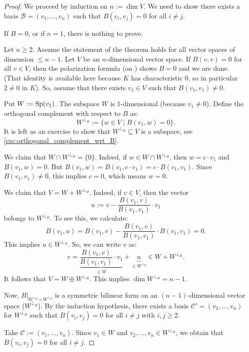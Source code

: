 \begin{proof}
We proceed by induction on $n := \dim V$. We need to show there exists a basis $\mathcal{B} = (v_1, \dots, v_n)$ such that $B(v_i, v_j) = 0$ for all $i \neq j$.

If $B = 0$, or if $n = 1$, there is nothing to prove.

Let $n \ge 2$. Assume the statement of the theorem holds for all vector spaces of dimension $\le n-1$. Let $V$ be an $n$-dimensional vector space.
If $B(v, v) = 0$ for all $v \in V$, then the polarization formula (on ) shows $B = 0$ and we are done. (That identity is available here because $K$ has characteristic $0$, so in particular $2 \neq 0$ in $K$). So, assume that there exists $v_1 \in V$ such that $B(v_1, v_1) \neq 0$.

Put $W := \operatorname{Sp}(v_1)$. The subspace $W$ is 1-dimensional (because $v_1 \neq 0$). Define the orthogonal complement with respect to $B$ as:
\[
W^{\perp_B} := \{ w \in V \mid B(v_1, w) = 0 \}.
\]
It is left as an exercise to show that $W^{\perp_B} \subseteq V$ is a subspace, see \cref{exc:orthogonal_complement_wrt_B}.

We claim that $W \cap W^{\perp_B} = \{0\}$. Indeed, if $w \in W \cap W^{\perp_B}$, then $w = c \cdot v_1$ and $B(v_1, w) = 0$. But $B(v_1, w) = B(v_1, c \cdot v_1) = c \cdot B(v_1, v_1)$. Since $B(v_1, v_1) \neq 0$, this implies $c = 0$, which means $w = 0$.

We claim that $V = W + W^{\perp_B}$.
Indeed, if $v \in V$, then the vector 
\[
u := v - \frac{B(v_1, v)}{B(v_1, v_1)} \cdot v_1
\]
belongs to $W^{\perp_B}$. To see this, we calculate:
\[
B(v_1, u) = B(v_1, v) - \frac{B(v_1, v)}{B(v_1, v_1)} \cdot B(v_1, v_1) = 0.
\]
This implies $u \in W^{\perp_B}$. So, we can write $v$ as:
\[
v = \underbrace{\frac{B(v_1, v)}{B(v_1, v_1)} \cdot v_1}_{\in W} + \underbrace{u}_{\in W^{\perp_B}} \in W + W^{\perp_B}.
\]
It follows that $V = W \oplus W^{\perp_B}$. This implies $\dim W^{\perp_B} = n - 1$.

Now, $B|_{W^{\perp_B} \times W^{\perp_B}}$ is a symmetric bilinear form on an $(n-1)$-dimensional vector space ($W^{\perp_B}$). By the induction hypothesis, there exists a basis $\mathcal{C}' = (v_2, \dots, v_n)$ for $W^{\perp_B}$ such that $B(v_i, v_j) = 0$ for all $i \neq j$ with $i, j \ge 2$.

Take $\mathcal{C} := (v_1, \dots, v_n)$. Since $v_1 \in W$ and $v_2, \dots, v_n \in W^{\perp_B}$, we obtain that $B(v_i, v_j) = 0$ for all $i \neq j$.
\end{proof}

